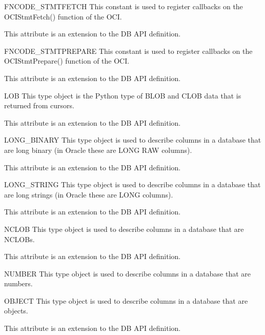 \documentclass{manual}
\begin{document}
\begin{datadesc}{FNCODE_STMTFETCH}
  This constant is used to register callbacks on the OCIStmtFetch() function
  of the OCI.

   This attribute is an extension to the DB API definition.
\end{datadesc}

\begin{datadesc}{FNCODE_STMTPREPARE}
  This constant is used to register callbacks on the OCIStmtPrepare() function
  of the OCI.

   This attribute is an extension to the DB API definition.
\end{datadesc}

\begin{datadesc}{LOB}
  This type object is the Python type of BLOB and CLOB data that is returned
  from cursors.

   This attribute is an extension to the DB API definition.
\end{datadesc}

\begin{datadesc}{LONG_BINARY}
  This type object is used to describe columns in a database that are long
  binary (in Oracle these are LONG RAW columns).

   This attribute is an extension to the DB API definition.
\end{datadesc}

\begin{datadesc}{LONG_STRING}
  This type object is used to describe columns in a database that are long
  strings (in Oracle these are LONG columns).

   This attribute is an extension to the DB API definition.
\end{datadesc}

\begin{datadesc}{NCLOB}
  This type object is used to describe columns in a database that are NCLOBs.

   This attribute is an extension to the DB API definition.
\end{datadesc}

\begin{datadesc}{NUMBER}
  This type object is used to describe columns in a database that are numbers.
\end{datadesc}

\begin{datadesc}{OBJECT}
  This type object is used to describe columns in a database that are objects.

   This attribute is an extension to the DB API definition.
\end{datadesc}
\end{document}
